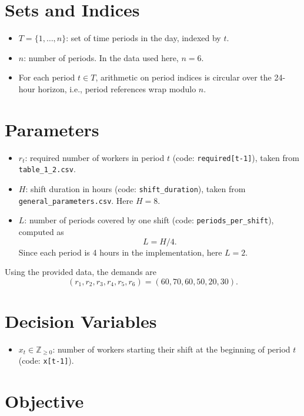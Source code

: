 \section*{Sets and Indices}

\begin{itemize}
    \item $T = \{1,\dots,n\}$: set of time periods in the day, indexed by $t$.
    \item $n$: number of periods. In the data used here, $n=6$.
    \item For each period $t \in T$, arithmetic on period indices is circular over the 24-hour horizon, i.e., period references wrap modulo $n$.
\end{itemize}

\section*{Parameters}

\begin{itemize}
    \item $r_t$: required number of workers in period $t$ (code: \texttt{required[t-1]}), taken from \texttt{table\_1\_2.csv}.
    \item $H$: shift duration in hours (code: \texttt{shift\_duration}), taken from \texttt{general\_parameters.csv}. Here $H=8$.
    \item $L$: number of periods covered by one shift (code: \texttt{periods\_per\_shift}), computed as
    \[
    L = H/4.
    \]
    Since each period is 4 hours in the implementation, here $L=2$.
\end{itemize}

Using the provided data, the demands are
\[
(r_1,r_2,r_3,r_4,r_5,r_6)=(60,70,60,50,20,30).
\]

\section*{Decision Variables}

\begin{itemize}
    \item $x_t \in \mathbb{Z}_{\ge 0}$: number of workers starting their shift at the beginning of period $t$ (code: \texttt{x[t-1]}).
\end{itemize}

\section*{Objective}

